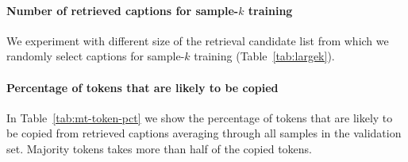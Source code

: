 \documentclass[11pt]{article}
\begin{document}
\paragraph*{Number of retrieved captions for sample-$k$ training}
We experiment with different size of the retrieval candidate list from which we randomly select captions for sample-$k$ training (Table~\ref{tab:largek}).

\begin{table}[ht]
\centering
    \caption{CIDEr score when sampling from different size of retrieval candidates. We see more improvements on random $k$ evaluation while almost keeping the same level of in-domain performance. With more noise involved during training, we would expect a longer training time would yield more robust performance.\label{tab:largek}}
\end{table}

\paragraph*{Percentage of tokens that are likely to be copied}
In Table~\ref{tab:mt-token-pct} we show the percentage of tokens that are likely to be copied from retrieved captions averaging through all samples in the validation set. Majority tokens takes more than half of the copied tokens.
\end{document}

